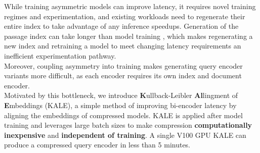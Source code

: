 \begin{table}[!htb]
    \centering
    \caption{Impact of structural pruning with and without KALE on Accuracy at 100 across various datasets. }
    \tiny
    \label{tab:kale-at-20}
\end{table}
While training asymmetric models can improve latency, it requires novel training regimes and experimentation, and existing workloads need to regenerate their entire index to take advantage of any inference speedups. Generation of the passage index can take longer than model training \cite{Karpukhin2020DensePR}, which makes regenerating a new index and retraining a model to meet changing latency requirements an inefficient experimentation pathway. \\Moreover, coupling asymmetry into training makes generating query encoder variants more difficult, as each encoder requires its own index and document encoder. \\
Motivated by this bottleneck, we introduce \textbf{K}ullback-Leibler \textbf{Al}lingment of \textbf{E}mbeddings (KALE), a simple method of improving bi-encoder latency by aligning the embeddings of compressed models. KALE is applied after model training and leverages large batch sizes to make compression \textbf{computationally inexpensive} and \textbf{independent of training}. A single V100 GPU KALE can produce a compressed query encoder in less than 5 minutes.  \\
